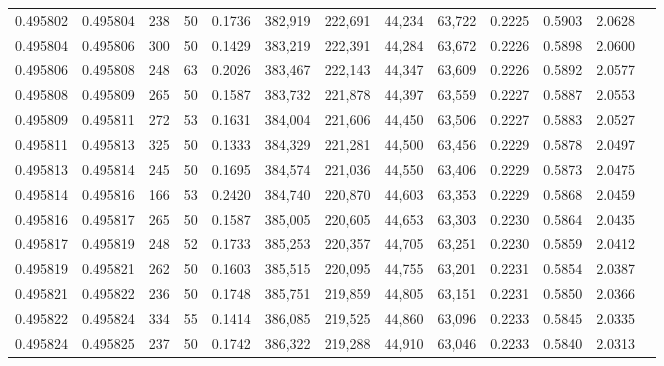 \begin{tabular}{rrrrrrrrrrrrr}
0.495802 & 0.495804 &   238 &  50 &                                     0.1736 & 382,919 & 222,691 &  44,234 &  63,722 & 0.2225 & 0.5903 & 2.0628 \\
0.495804 & 0.495806 &   300 &  50 &                                     0.1429 & 383,219 & 222,391 &  44,284 &  63,672 & 0.2226 & 0.5898 & 2.0600 \\
0.495806 & 0.495808 &   248 &  63 &                                     0.2026 & 383,467 & 222,143 &  44,347 &  63,609 & 0.2226 & 0.5892 & 2.0577 \\
0.495808 & 0.495809 &   265 &  50 &                                     0.1587 & 383,732 & 221,878 &  44,397 &  63,559 & 0.2227 & 0.5887 & 2.0553 \\
0.495809 & 0.495811 &   272 &  53 &                                     0.1631 & 384,004 & 221,606 &  44,450 &  63,506 & 0.2227 & 0.5883 & 2.0527 \\
0.495811 & 0.495813 &   325 &  50 &                                     0.1333 & 384,329 & 221,281 &  44,500 &  63,456 & 0.2229 & 0.5878 & 2.0497 \\
0.495813 & 0.495814 &   245 &  50 &                                     0.1695 & 384,574 & 221,036 &  44,550 &  63,406 & 0.2229 & 0.5873 & 2.0475 \\
0.495814 & 0.495816 &   166 &  53 &                                     0.2420 & 384,740 & 220,870 &  44,603 &  63,353 & 0.2229 & 0.5868 & 2.0459 \\
0.495816 & 0.495817 &   265 &  50 &                                     0.1587 & 385,005 & 220,605 &  44,653 &  63,303 & 0.2230 & 0.5864 & 2.0435 \\
0.495817 & 0.495819 &   248 &  52 &                                     0.1733 & 385,253 & 220,357 &  44,705 &  63,251 & 0.2230 & 0.5859 & 2.0412 \\
0.495819 & 0.495821 &   262 &  50 &                                     0.1603 & 385,515 & 220,095 &  44,755 &  63,201 & 0.2231 & 0.5854 & 2.0387 \\
0.495821 & 0.495822 &   236 &  50 &                                     0.1748 & 385,751 & 219,859 &  44,805 &  63,151 & 0.2231 & 0.5850 & 2.0366 \\
0.495822 & 0.495824 &   334 &  55 &                                     0.1414 & 386,085 & 219,525 &  44,860 &  63,096 & 0.2233 & 0.5845 & 2.0335 \\
0.495824 & 0.495825 &   237 &  50 &                                     0.1742 & 386,322 & 219,288 &  44,910 &  63,046 & 0.2233 & 0.5840 & 2.0313 \\

\end{tabular}

